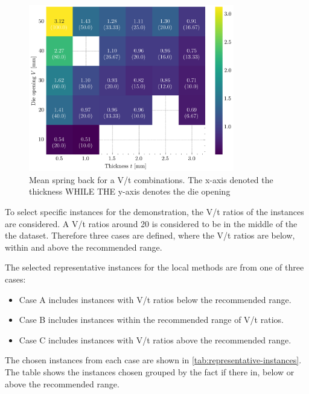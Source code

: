 \begin{figure}[h]
    \begin{tcolorbox}[arc=0pt,boxrule=0.5pt]
        \centering
        \includegraphics[width=0.8\textwidth]{chap5/images/mean_springback_heatmap}
    \end{tcolorbox}
    \caption{Mean spring back for a V/t combinations. The x-axis denoted the thickness WHILE THE y-axis denotes the
    die opening}
    \label{fig:springback-heatmap}
\end{figure}

To select specific instances for the demonstration, the V/t ratios of the instances are considered.
A V/t ratios around 20 is considered to be in the middle of the the dataset.
Therefore three cases are defined, where the V/t ratios are below, within and above the recommended range.

The selected representative instances for the local methods are from one of three cases:
\begin{itemize}
    \item Case A includes instances with V/t ratios below the recommended range.
    \item Case B includes instances within the recommended range of V/t ratios.
    \item Case C includes instances with V/t ratios above the recommended range.
\end{itemize}

The chosen instances from each case are shown in \cref{tab:representative-instances}.
The table shows the instances chosen grouped by the fact if there in, below or above the recommended range.

